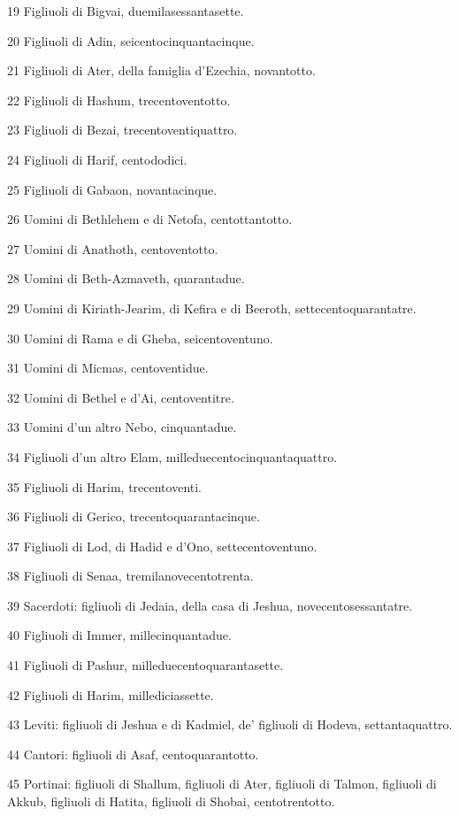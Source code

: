\par 19 Figliuoli di Bigvai, duemilasessantasette.
\par 20 Figliuoli di Adin, seicentocinquantacinque.
\par 21 Figliuoli di Ater, della famiglia d'Ezechia, novantotto.
\par 22 Figliuoli di Hashum, trecentoventotto.
\par 23 Figliuoli di Bezai, trecentoventiquattro.
\par 24 Figliuoli di Harif, centododici.
\par 25 Figliuoli di Gabaon, novantacinque.
\par 26 Uomini di Bethlehem e di Netofa, centottantotto.
\par 27 Uomini di Anathoth, centoventotto.
\par 28 Uomini di Beth-Azmaveth, quarantadue.
\par 29 Uomini di Kiriath-Jearim, di Kefira e di Beeroth, settecentoquarantatre.
\par 30 Uomini di Rama e di Gheba, seicentoventuno.
\par 31 Uomini di Micmas, centoventidue.
\par 32 Uomini di Bethel e d'Ai, centoventitre.
\par 33 Uomini d'un altro Nebo, cinquantadue.
\par 34 Figliuoli d'un altro Elam, milleduecentocinquantaquattro.
\par 35 Figliuoli di Harim, trecentoventi.
\par 36 Figliuoli di Gerico, trecentoquarantacinque.
\par 37 Figliuoli di Lod, di Hadid e d'Ono, settecentoventuno.
\par 38 Figliuoli di Senaa, tremilanovecentotrenta.
\par 39 Sacerdoti: figliuoli di Jedaia, della casa di Jeshua, novecentosessantatre.
\par 40 Figliuoli di Immer, millecinquantadue.
\par 41 Figliuoli di Pashur, milleduecentoquarantasette.
\par 42 Figliuoli di Harim, millediciassette.
\par 43 Leviti: figliuoli di Jeshua e di Kadmiel, de' figliuoli di Hodeva, settantaquattro.
\par 44 Cantori: figliuoli di Asaf, centoquarantotto.
\par 45 Portinai: figliuoli di Shallum, figliuoli di Ater, figliuoli di Talmon, figliuoli di Akkub, figliuoli di Hatita, figliuoli di Shobai, centotrentotto.
